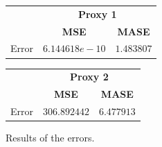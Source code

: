 \begin{figure}[!h]
\centering
\begin{minipage}{\textwidth}
\begin{minipage}{0.5\textwidth}
\begin{center}
\vskip10pt
   \begin{footnotesize}
   \begin{tabular}{|c|c|c|}
   \hline
   & \multicolumn{2}{|c|}{\textbf{Proxy 1}} \\ \cline{2-3}
   & \textbf{MSE} & \textbf{MASE}          \\ \hline
   Error & $6.144618e-10$ & $1.483807$     \\ 
   \hline
   \end{tabular}
   \end{footnotesize}
\end{center}
\end{minipage}
\begin{minipage}{0.5\textwidth}
\begin{center}
\vskip12pt
   \begin{footnotesize}
   \begin{tabular}{|c|c|c|}
   \hline
   & \multicolumn{2}{|c|}{\textbf{Proxy 2}} \\ \cline{2-3}
   & \textbf{MSE} & \textbf{MASE}          \\ \hline
   Error & $306.892442$ & $6.477913$     \\ 
   \hline
   \end{tabular}
   \end{footnotesize}
\end{center}
\end{minipage}
\end{minipage}
\caption{Results of the errors.}
\label{fig:table6mNaive}
\end{figure}
